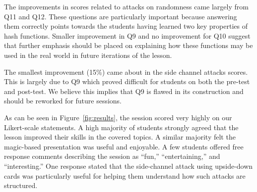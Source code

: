 The improvements in scores related to attacks on randomness came largely
from Q11 and Q12.  These questions are particularly important because
answering them correctly points towards the students having learned two
key properties of hash functions.  Smaller improvement in Q9 and no
improvement for Q10 suggest that further emphasis should be placed on
explaining how these functions may be used in the real world in future
iterations of the lesson.

The smallest improvement (15\%) came about in the side channel attacks
scores.  This is largely due to Q9 which proved difficult for students on
both the pre-test and post-test.  We believe this implies that Q9 is
flawed in its construction and should be reworked for future sessions.

As can be seen in Figure~\ref{fig:results}, the session scored very highly
on our Likert-scale statements.  A high majority of students strongly
agreed that the lesson improved their skills in the covered topics.  A
similar majority felt the magic-based presentation was useful and
enjoyable.  A few students offered free response comments describing the
session as ``fun,'' ``entertaining,'' and ``interesting.''  One response
stated that the side-channel attack using upside-down cards
was particularly useful for helping them understand how such attacks are
structured.


%
%


